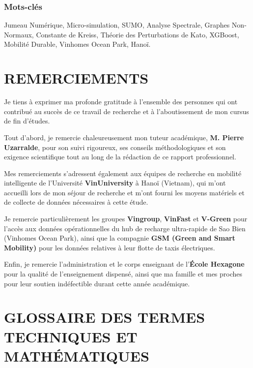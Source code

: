 \documentclass[10pt, a4paper]{article}
\begin{document}
\subsubsection{Mots-clés}\label{mots-cluxe9s}

Jumeau Numérique, Micro-simulation, SUMO, Analyse Spectrale, Graphes
Non-Normaux, Constante de Kreiss, Théorie des Perturbations de Kato,
XGBoost, Mobilité Durable, Vinhomes Ocean Park, Hanoï.

\newpage

\section{REMERCIEMENTS}\label{remerciements}

Je tiens à exprimer ma profonde gratitude à l'ensemble des personnes qui
ont contribué au succès de ce travail de recherche et à l'aboutissement
de mon cursus de fin d'études.

Tout d'abord, je remercie chaleureusement mon tuteur académique,
\textbf{M. Pierre Uzarralde}, pour son suivi rigoureux, ses conseils
méthodologiques et son exigence scientifique tout au long de la
rédaction de ce rapport professionnel.

Mes remerciements s'adressent également aux équipes de recherche en
mobilité intelligente de l'Université \textbf{VinUniversity} à Hanoï
(Vietnam), qui m'ont accueilli lors de mon séjour de recherche et m'ont
fourni les moyens matériels et de collecte de données nécessaires à
cette étude.

Je remercie particulièrement les groupes \textbf{Vingroup},
\textbf{VinFast} et \textbf{V-Green} pour l'accès aux données
opérationnelles du hub de recharge ultra-rapide de Sao Bien (Vinhomes
Ocean Park), ainsi que la compagnie \textbf{GSM (Green and Smart
Mobility)} pour les données relatives à leur flotte de taxis
électriques.

Enfin, je remercie l'administration et le corps enseignant de
l'\textbf{École Hexagone} pour la qualité de l'enseignement dispensé,
ainsi que ma famille et mes proches pour leur soutien indéfectible
durant cette année académique.

\newpage

\section{GLOSSAIRE DES TERMES TECHNIQUES ET
MATHÉMATIQUES}\label{glossaire-des-termes-techniques-et-mathuxe9matiques}
\end{document}
